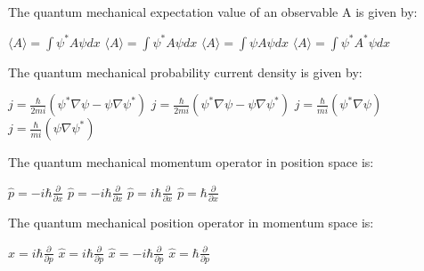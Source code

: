 \begin{question}[2]
The quantum mechanical expectation value of an observable A is given by:

\begin{oneparcheckboxes}
\choice $\displaystyle \langle A \rangle = \int \psi^* A \psi dx$
\correctchoice $\displaystyle \langle A \rangle = \int \psi^* A \psi dx$
\choice $\displaystyle \langle A \rangle = \int \psi A \psi dx$
\choice $\displaystyle \langle A \rangle = \int \psi^* A^* \psi dx$
\end{oneparcheckboxes}
\end{question}

\begin{question}[2]
The quantum mechanical probability current density is given by:

\begin{oneparcheckboxes}
\choice $\displaystyle j = \frac{\hbar}{2mi}(\psi^*\nabla\psi - \psi\nabla\psi^*)$
\correctchoice $\displaystyle j = \frac{\hbar}{2mi}(\psi^*\nabla\psi - \psi\nabla\psi^*)$
\choice $\displaystyle j = \frac{\hbar}{mi}(\psi^*\nabla\psi)$
\choice $\displaystyle j = \frac{\hbar}{mi}(\psi\nabla\psi^*)$
\end{oneparcheckboxes}
\end{question}

\begin{question}[2]
The quantum mechanical momentum operator in position space is:

\begin{oneparcheckboxes}
\choice $\displaystyle \hat{p} = -i\hbar\frac{\partial}{\partial x}$
\correctchoice $\displaystyle \hat{p} = -i\hbar\frac{\partial}{\partial x}$
\choice $\displaystyle \hat{p} = i\hbar\frac{\partial}{\partial x}$
\choice $\displaystyle \hat{p} = \hbar\frac{\partial}{\partial x}$
\end{oneparcheckboxes}
\end{question}

\begin{question}[2]
The quantum mechanical position operator in momentum space is:

\begin{oneparcheckboxes}
\choice $\displaystyle \hat{x} = i\hbar\frac{\partial}{\partial p}$
\correctchoice $\displaystyle \hat{x} = i\hbar\frac{\partial}{\partial p}$
\choice $\displaystyle \hat{x} = -i\hbar\frac{\partial}{\partial p}$
\choice $\displaystyle \hat{x} = \hbar\frac{\partial}{\partial p}$
\end{oneparcheckboxes}
\end{question}

